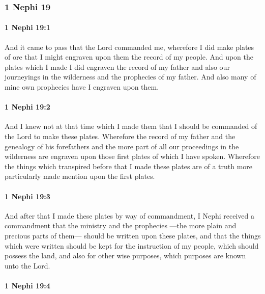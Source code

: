 	\subsubsection{1 Nephi 19} %
		\label{1NEPHI-19}
		
		\paragraph{1 Nephi 19:1} %
			\label{1NEPHI-19-1}

			And it came to pass that the Lord commanded me,
			wherefore I did make plates of ore
			that I might engraven upon them the record of my people.
			And upon the plates which I made I did engraven the record of my father
			and also our journeyings in the wilderness and the prophecies of my father.
			And also many of mine own prophecies have I engraven upon them.

		\paragraph{1 Nephi 19:2} %
			\label{1NEPHI-19-2}

			And I knew not at that time which I made them
			that I should be commanded of the Lord to make these plates.
			Wherefore the record of my father and the genealogy of his forefathers
			and the more part of all our proceedings in the wilderness
			are engraven upon those first plates of which I have spoken.
			Wherefore the things which transpired before that I made these plates
			are of a truth more particularly made mention upon the first plates.

		\paragraph{1 Nephi 19:3} %
			\label{1NEPHI-19-3}

			And after that I made these plates by way of commandment,
			I Nephi received a commandment
			that the ministry and the prophecies
			---the more plain and precious parts of them---
			should be written upon these plates,
			and that the things which were written
			should be kept for the instruction of my people,
			which should possess the land,
			and also for other wise purposes,
			which purposes are known unto the Lord.

		\paragraph{1 Nephi 19:4} %
			\label{1NEPHI-19-4}

